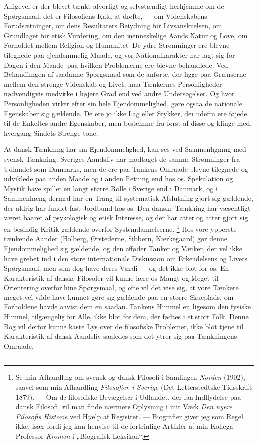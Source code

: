 \documentclass[12pt,a4paper,openany]{book}
\newcommand{\opage}[1]{\marginnote{\footnotesize\textit{[#1]}}}
\begin{document}
Alligevel er der blevet tænkt alvorligt og selvstændigt herhjemme om de
Spørgsmaal, det er Filosofiens Kald at drøfte, --- om Videnskabens
Forudsætninger, om dens Resultaters Betydning for Livsanskuelsen, om
Grundlaget for etisk Vurdering, om den menneskelige Aands Natur og Love, om
Forholdet mellem Religion og Humanitet. De ydre Strømninger ere blevne
tilegnede paa ejendommelig Maade, og vor Nationalkarakter har lagt sig for
Dagen i den Maade, paa hvilken Problemerne ere blevne behandlede. Ved
Behandlingen af saadanne Spørgsmaal som de anførte, der ligge paa Grænserne
mellem den strenge Videnskab og Livet, maa Tænkernes Personligheder
nødvendigvis medvirke i højere Grad end ved andre Undersøgelser. Og hvor
Personligheden virker efter sin hele Ejendommelighed, gøre ogsaa de nationale
Egenskaber sig gældende. De ere jo ikke Lag eller Stykker, der udefra ere
føjede til de Enkeltes andre Egenskaber, men bestemme fra først af disse og
klinge med, hvergang Sindets Strenge tone.

At dansk Tænkning har sin Ejendommelighed, kan ses ved Sammenligning med
svensk Tænkning. Sveriges Aandsliv
\setcounter{footnote}{0}%
\opage{2}har modtaget de samme Strømninger fra Udlandet som Danmarks, men de ere paa
Tankens Omraade blevne tilegnede og udviklede paa anden Maade og i anden
Retning end hos os. Spekulation og Mystik have spillet en langt større Rolle i
Sverige end i Danmark, og i Sammenhæng dermed har en Trang til systematisk
Afslutning gjort sig gældende, der aldrig har fundet fast Jordbund hos os. Den
danske Tænkning har væsentligt været baaret af psykologisk og etisk Interesse,
og der har atter og atter gjort sig en besindig Kritik gældende overfor
Systemdannelserne.%
\footnote[1]{Se min Afhandling om svensk og dansk Filosofi i Samlingen
\textit{Norden} (1902), saavel som min Afhandling \textit{Filosofien i Sverige}
(Det Letterstedtske Tidsskrift 1879). --- Om de filosofiske Bevægelser i
Udlandet, der faa Indflydelse paa dansk Filosofi, vil man finde nærmere
Oplysning i mit Værk \textit{Den nyere Filosofis Historie} ved Hjælp af
Registret. --- Biografier giver jeg som Regel ikke, især fordi jeg kan henvise
til de fortrinlige Artikler af min Kollega Professor \emph{Kroman} i
„Biografisk Leksikon“.} Hos vore ypperste tænkende Aander (Holberg,
Ørstederne, Sibbern, Kierkegaard) gør denne Ejendommelighed sig gældende, og
den afføder Tanker og Værker, der vel ikke have grebet ind i den store
internationale Diskussion om Erkendelsens og Livets Spørgsmaal, men som dog
have deres Værdi --- og det ikke blot for os. En Karakteristik af danske
Filosofer vil kunne lære os Mangt og Meget til Orientering overfor hine
Spørgsmaal, og ofte vil det vise sig, at vore Tænkere meget vel vilde have
kunnet gøre sig gældende paa en større Skueplads, om Forholdene havde anvist
dem en saadan. Tankens Himmel er, ligesom den fysiske Himmel, tilgængelig for
Alle, ikke blot for dem, der fødtes i et stort Folk. Denne Bog vil derfor kunne
kaste Lys over de filosofiske Problemer, ikke blot tjene til Karakteristik af
dansk Aandsliv saaledes som det ytrer sig paa Tænkningens Omraade.

\begin{center}\rule{2cm}{0.4pt}\end{center}
\clearpage

\end{document}
